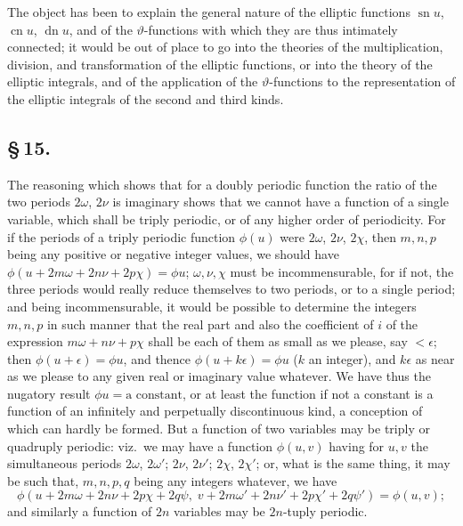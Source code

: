 \documentclass[11pt,a4paper]{article}
\DeclareMathOperator{\sn}{sn}
\DeclareMathOperator{\cn}{cn}
\DeclareMathOperator{\dn}{dn}
\begin{document}
The object has been to explain the general nature of the elliptic functions $\sn u$, $\cn u$, $\dn u$, and of the $\vartheta$-functions with which they are thus intimately connected; it would be out of place to go into the theories of the multiplication, division, and transformation of the elliptic functions, or into the theory of the elliptic integrals, and of the application of the $\vartheta$-functions to the representation of the elliptic integrals of the second and third kinds.

\subsection*{\S\,15.}

The reasoning which shows that for a doubly periodic function the ratio of the two periods $2\omega$, $2\nu$ is imaginary shows that we cannot have a function of a single variable, which shall be triply periodic, or of any higher order of periodicity. For if the periods of a triply periodic function $\phi(u)$ were $2\omega$, $2\nu$, $2\chi$, then $m, n, p$ being any positive or negative integer values, we should have $\phi(u + 2m\omega + 2n\nu + 2p\chi) = \phi u$; $\omega, \nu, \chi$ must be incommensurable, for if not, the three periods would really reduce themselves to two periods, or to a single period; and being incommensurable, it would be possible to determine the integers $m, n, p$ in such manner that the real part and also the coefficient of $i$ of the expression $m\omega + n\nu + p\chi$ shall be each of them as small as we please, say $< \epsilon$; then $\phi(u + \epsilon) = \phi u$, and thence $\phi(u + k\epsilon) = \phi u$ ($k$ an integer), and $k\epsilon$ as near as we please to any given real or imaginary value whatever. We have thus the nugatory result $\phi u = \text{a constant}$, or at least the function if not a constant is a function of an infinitely and perpetually discontinuous kind, a conception of which can hardly be formed. But a function of two variables may be triply or quadruply periodic: viz.\ we may have a function $\phi(u, v)$ having for $u, v$ the simultaneous periods $2\omega$, $2\omega'$; $2\nu$, $2\nu'$; $2\chi$, $2\chi'$; or, what is the same thing, it may be such that, $m, n, p, q$ being any integers whatever, we have
\[
\phi(u + 2m\omega + 2n\nu + 2p\chi + 2q\psi,\; v + 2m\omega' + 2n\nu' + 2p\chi' + 2q\psi') = \phi(u, v);
\]
and similarly a function of $2n$ variables may be $2n$-tuply periodic.
\end{document}
